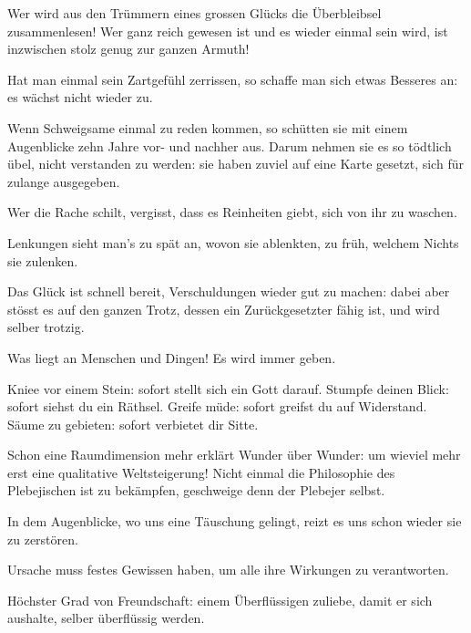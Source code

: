 Wer wird aus den Trümmern eines grossen Glücks die Überbleibsel zusammenlesen! Wer ganz reich gewesen ist und es wieder einmal sein wird, ist inzwischen stolz genug zur ganzen Armuth!
\par

Hat man einmal sein Zartgefühl zerrissen, so schaffe man sich etwas Besseres an: es wächst nicht wieder zu.
\par

Wenn Schweigsame einmal zu reden kommen, so schütten sie mit einem Augenblicke zehn Jahre vor- und nachher aus. Darum nehmen sie es so tödtlich übel, nicht verstanden zu werden: sie haben zuviel auf eine Karte gesetzt, sich für zulange ausgegeben.
\par

Wer die Rache schilt, vergisst, dass es Reinheiten giebt, sich von ihr zu waschen.
\par

Lenkungen sieht man’s zu spät an, wovon sie ablenkten, zu früh, welchem Nichts sie zulenken.
\par

Das Glück ist schnell bereit, Verschuldungen wieder gut zu machen: dabei aber stösst es auf den ganzen Trotz, dessen ein Zurückgesetzter fähig ist, und wird selber trotzig.
\par

Was liegt an Menschen und Dingen! Es wird immer   geben.
\par

Kniee vor einem Stein: sofort stellt sich ein Gott darauf. Stumpfe deinen Blick: sofort siehst du ein Räthsel. Greife müde: sofort greifst du auf Widerstand. Säume zu gebieten: sofort verbietet dir Sitte.
\par

Schon eine Raumdimension mehr erklärt Wunder über Wunder: um wieviel mehr erst eine qualitative Weltsteigerung! Nicht einmal die Philosophie des Plebejischen ist zu bekämpfen, geschweige denn der Plebejer selbst.
\par

In dem Augenblicke, wo uns eine Täuschung gelingt, reizt es uns schon wieder sie zu zerstören.
\par

Ursache muss festes Gewissen haben, um alle ihre Wirkungen zu verantworten.
\par

Höchster Grad von Freundschaft: einem Überflüssigen zuliebe, damit er sich aushalte, selber überflüssig werden.
\par

